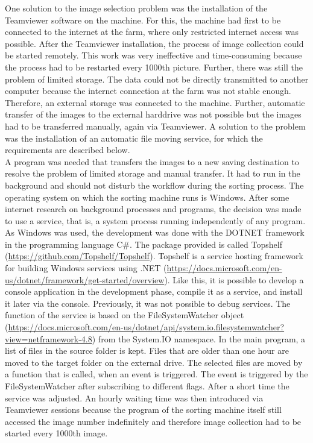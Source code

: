 One solution to the image selection problem was the installation of the Teamviewer software on the machine. For this, the machine had first to be connected to the internet at the farm, where only restricted internet access was possible. After the Teamviewer installation, the process of image collection could be started remotely. This work was very ineffective and time-consuming because the process had to be restarted every 1000th picture. Further, there was still the problem of limited storage. The data could not be directly transmitted to another computer because the internet connection at the farm was not stable enough. Therefore, an external storage was connected to the machine. Further, automatic transfer of the images to the external harddrive was not possible but the images had to be transferred manually, again via Teamviewer. A solution to the problem was the installation of an automatic file moving service, for which the requirements are described below. \\
A program was needed that transfers the images to a new saving destination to resolve the problem of limited storage and manual transfer. It had to run in the background and should not disturb the workflow during the sorting process. The operating system on which the sorting machine runs is Windows. After some internet research on background processes and programs, the decision was made to use a service, that is, a system process running independently of any program. As Windows was used, the development was done with the DOTNET framework in the programming language C#. The package provided is called Topshelf (\url{https://github.com/Topshelf/Topshelf}). Topshelf is a service hosting framework for building Windows services using .NET (\url{https://docs.microsoft.com/en-us/dotnet/framework/get-started/overview}). Like this, it is possible to develop a console application in the development phase, compile it as a service, and install it later via the console. Previously, it was not possible to debug services. The function of the service is based on the FileSystemWatcher object (\url{https://docs.microsoft.com/en-us/dotnet/api/system.io.filesystemwatcher?view=netframework-4.8}) from the System.IO namespace. In the main program, a list of files in the source folder is kept. Files that are older than one hour are moved to the target folder on the external drive. The selected files are moved by a function that is called, when an event is triggered. The event is triggered by the FileSystemWatcher after subscribing to different flags. After a short time the service was adjusted. An hourly waiting time was then introduced via Teamviewer sessions because the program of the sorting machine itself still accessed the image number indefinitely and therefore image collection had to be started every 1000th image. \\
